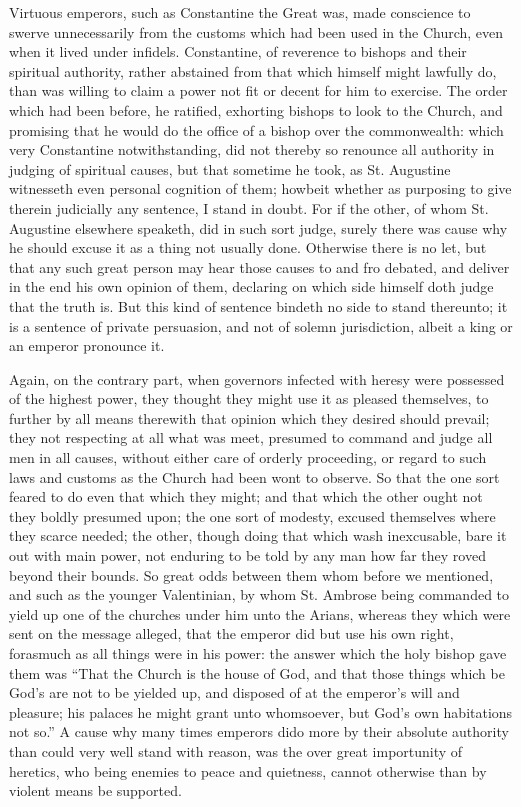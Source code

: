 Virtuous emperors, such as Constantine the Great was, made conscience to swerve unnecessarily from the customs which had been used in the Church, even when it lived under infidels. Constantine, of reverence to bishops and their spiritual authority, rather abstained from that which himself might lawfully do, than was willing to claim a power not fit or decent for him to exercise. The order which had been before, he ratified, exhorting bishops to look to the Church, and promising that he would do the office of a bishop over the commonwealth: which very Constantine notwithstanding, did  not thereby so renounce all authority in judging of spiritual causes, but that sometime he took, as St. Augustine witnesseth even personal cognition of them; howbeit whether as purposing to give therein judicially any sentence, I stand in doubt. For if the other, of whom St. Augustine elsewhere speaketh, did in such sort judge, surely there was cause why he should excuse it as a thing not usually done. Otherwise there is no let, but that any such great person may hear those causes to and fro debated, and deliver in the end his own opinion of them, declaring on which side himself doth judge that the truth is. But this kind of sentence bindeth no side to stand thereunto; it is a sentence of private persuasion, and not of solemn jurisdiction, albeit a king or an emperor pronounce it.

Again, on the contrary part, when governors infected with heresy were possessed of the highest power, they thought they might use it as pleased themselves, to further by all means therewith that opinion which they desired should prevail; they not respecting at all what was meet, presumed to command and judge all men in all causes, without either care of orderly proceeding, or regard to such laws and customs as the Church had been wont to observe. So that the one sort feared to do even that which they might; and that which the other ought not they boldly presumed upon; the one sort of modesty, excused themselves where they scarce needed; the other, though doing that which wash inexcusable, bare it out with main power, not enduring to be told by any man how far they roved beyond their bounds. So great odds between them whom before we mentioned, and such as the younger Valentinian, by whom St. Ambrose being commanded to yield up one of the churches under him unto the Arians, whereas they which were sent on the message alleged, that the emperor did but use his own right, forasmuch as all things were in his power: the answer which the holy bishop gave them was  “That the Church is the house of God, and that those things which be God’s are not to be yielded up, and disposed of at the emperor’s will and pleasure; his palaces he might grant unto whomsoever, but God’s own habitations not so.” A cause why many times emperors dido more by their absolute authority than could very well stand with reason, was the over great importunity of heretics, who being enemies to peace and quietness, cannot otherwise than by violent means be supported.

